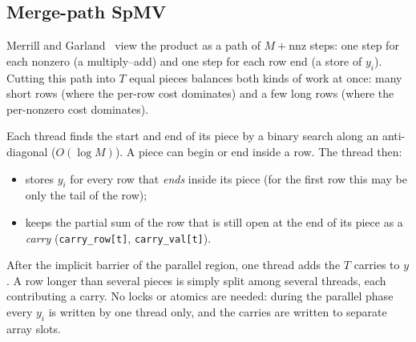 \documentclass[11pt,a4paper]{article}
\begin{document}
\subsection{Merge-path SpMV}
Merrill and Garland~\cite{merrill} view the product as a path of $M+\text{nnz}$ steps: one
step for each nonzero (a multiply--add) and one step for each row end (a store of $y_i$).
Cutting this path into $T$ equal pieces balances both kinds of work at once: many short
rows (where the per-row cost dominates) and a few long rows (where the per-nonzero cost
dominates).

\begin{center}
\end{center}

Each thread finds the start and end of its piece by a binary search along an
anti-diagonal ($O(\log M)$). A piece can begin or end inside a row. The thread then:
\begin{itemize}
  \item stores $y_i$ for every row that \emph{ends} inside its piece (for the first row this
        may be only the tail of the row);
  \item keeps the partial sum of the row that is still open at the end of its piece as a
        \emph{carry} (\texttt{carry\_row[t]}, \texttt{carry\_val[t]}).
\end{itemize}
After the implicit barrier of the parallel region, one thread adds the $T$ carries to $y$.
A row longer than several pieces is simply split among several threads, each contributing a
carry. No locks or atomics are needed: during the parallel phase every $y_i$ is written by
one thread only, and the carries are written to separate array slots.
\end{document}
